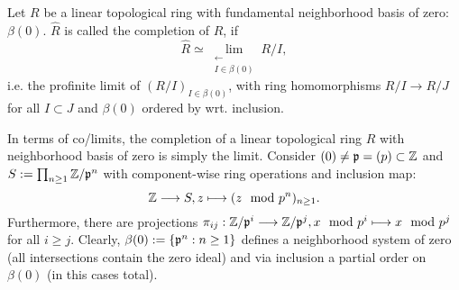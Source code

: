 \begin{defi}
Let $R$ be a linear topological ring with fundamental neighborhood basis of zero: $\beta(0)$. $\hat{R}$ is called the completion of $R$, if
$$\hat{R} \simeq \lim_{\substack{\longleftarrow\\I \in \beta(0)}} R/I,$$
i.e. the profinite limit of $(R/I)_{I \in \beta(0)}$, with ring homomorphisms $R/I \longrightarrow R/J$ for all $I \subset J$ and $\beta(0)$ ordered by wrt. inclusion.
\end{defi}
\bmk In terms of co/limits, the completion of a linear topological ring $R$ with neighborhood basis of zero is simply the limit.
\bsp Consider $(0) \neq \mathfrak{{p}} = (p) \subset \mathbb{Z}$ and $S := \prod_{n \geq 1} \mathbb{Z}/\mathfrak{{p}}^n$ with component-wise ring operations and inclusion map:
$$\mathbb{Z} \longrightarrow S, z \longmapsto (z \mod p^n)_{n\geq1}.$$
Furthermore, there are projections $\pi_{ij} : \mathbb{Z}/\mathfrak{{p}}^i \longrightarrow \mathbb{Z}/\mathfrak{{p}}^j, x \mod p^i \longmapsto x \mod p^j$ for all $i \geq j$. Clearly, $\beta(0) := \{\mathfrak{{p}}^n : n \geq 1\}$ defines a neighborhood system of zero (all intersections contain the zero ideal) and via inclusion a partial order on $\beta(0)$ (in this cases total).
%
